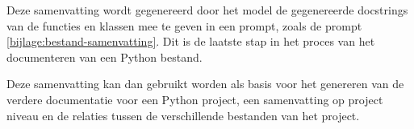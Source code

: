 Deze samenvatting wordt gegenereerd door het model de gegenereerde docstrings van de functies en klassen mee te geven in een prompt, zoals de prompt \ref{bijlage:bestand-samenvatting}.
Dit is de laatste stap in het proces van het documenteren van een Python bestand.

Deze samenvatting kan dan gebruikt worden als basis voor het genereren van de verdere documentatie voor een Python project, een samenvatting op project niveau en de relaties tussen de verschillende bestanden van het project.





